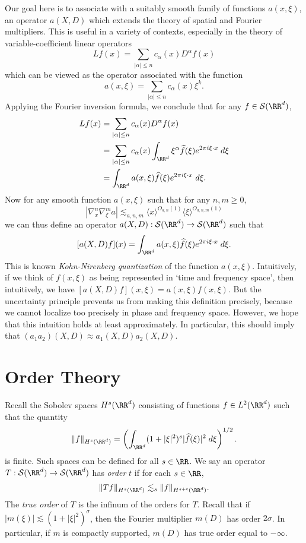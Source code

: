 Our goal here is to associate with a suitably smooth family of functions $a(x,\xi)$, an operator $a(X,D)$ which extends the theory of spatial and Fourier multipliers. This is useful in a variety of contexts, especially in the theory of variable-coefficient linear operators
%
\[ Lf(x) = \sum_{|\alpha| \leq n} c_\alpha(x) D^\alpha f(x) \]
%
which can be viewed as the operator associated with the function
%
\[ a(x,\xi) = \sum_{|\alpha| \leq n} c_\alpha(x) \xi^k. \]
%
Applying the Fourier inversion formula, we conclude that for any $f \in \mathcal{S}(\RR^d)$,
%
\begin{align*}
  Lf(x) &= \sum_{|\alpha| \leq n} c_\alpha(x) D^\alpha f(x)\\
  &= \sum_{|\alpha| \leq n} c_\alpha(x) \int_{\RR^d} \xi^\alpha \widehat{f}(\xi) e^{2 \pi i \xi \cdot x}\; d\xi\\
  &= \int_{\RR^d} a(x,\xi) \widehat{f}(\xi) e^{2 \pi i \xi \cdot x}\; d\xi.
\end{align*}
%
Now for any smooth function $a(x,\xi)$ such that for any $n,m \geq 0$,
%
\[ |\nabla_x^n \nabla_\xi^m a| \lesssim_{a,n,m} \langle x \rangle^{O_{a,n}(1)} \langle \xi \rangle^{O_{a,n,m}(1)} \]
%
we can thus define an operator $a(X,D): \mathcal{S}(\RR^d) \to \mathcal{S}(\RR^d)$ such that
%
\[ [a(X,D) f](x) = \int_{\RR^d} a(x,\xi) \widehat{f}(\xi) e^{2 \pi i \xi \cdot x}\; d\xi. \]
%
This is known \emph{Kohn-Nirenberg quantization} of the function $a(x,\xi)$. Intuitively, if we think of $f(x,\xi)$ as being represented in `time and frequency space', then intuitively, we have $[a(X,D) f](x,\xi) = a(x,\xi) f(x,\xi)$. But the uncertainty principle prevents us from making this definition precisely, because we cannot localize too precisely in phase and frequency space. However, we hope that this intuition holds at least approximately. In particular, this should imply that $(a_1a_2)(X,D) \approx a_1(X,D) a_2(X,D)$.

\section{Order Theory}

Recall the Sobolev spaces $H^s(\RR^d)$ consisting of functions $f \in L^2(\RR^d)$ such that the quantity
%
\[ \| f \|_{H^s(\RR^d)} = \left( \int_{\RR^d} (1 + |\xi|^2)^s |\widehat{f}(\xi)|^2\; d\xi \right)^{1/2}. \]
%
is finite. Such spaces can be defined for all $s \in \RR$. We say an operator $T: \mathcal{S}(\RR^d) \to \mathcal{S}(\RR^d)$ has \emph{order} $t$ if for each $s \in \RR$,
%
\[ \| Tf \|_{H^s(\RR^d)} \lesssim_s \| f \|_{H^{s+t}(\RR^d)}. \]
%
The \emph{true order} of $T$ is the infinum of the orders for $T$. Recall that if $|m(\xi)| \lesssim (1 + |\xi|^2)^\sigma$, then the Fourier multiplier $m(D)$ has order $2\sigma$. In particular, if $m$ is compactly supported, $m(D)$ has true order equal to $-\infty$.

